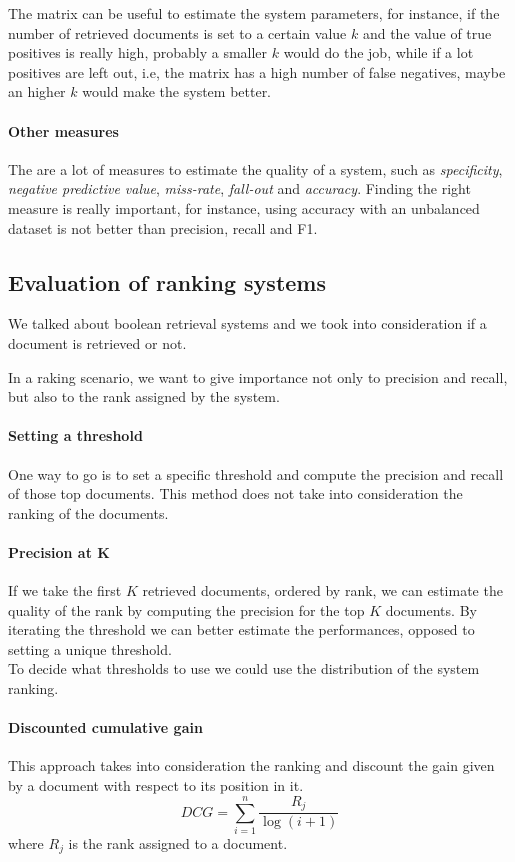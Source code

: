 The matrix can be useful to estimate the system parameters, for instance, 
if the number of retrieved documents is set to a certain value $k$ and 
the value of true positives is really high, probably a smaller $k$ would do the job, 
while if a lot positives are left out, i.e, the matrix has a high number of
false negatives, maybe an higher $k$ would make the system better.

\paragraph{Other measures}
The are a lot of measures to estimate the quality of a system, such as 
\emph{specificity}, \emph{negative predictive value}, \emph{miss-rate}, 
\emph{fall-out} and \emph{accuracy}. 
Finding the right measure is really important, for instance, using accuracy with
an unbalanced dataset is not better than precision, recall and F1.

\subsection{Evaluation of ranking systems}
We talked about boolean retrieval systems and we took into consideration 
if a document is retrieved or not.

In a raking scenario, we want to give importance not only to precision and recall, 
but also to the rank assigned by the system.

\paragraph{Setting a threshold}
One way to go is to set a specific threshold and compute the precision and recall 
of those top documents.
This method does not take into consideration the ranking of the documents.

\paragraph{Precision at K}
If we take the first $K$ retrieved documents, ordered by rank, we can estimate 
the quality of the rank by computing the precision for the top $K$ documents.
By iterating the threshold we can better estimate the performances, opposed to 
setting a unique threshold.\\
To decide what thresholds to use we could use the distribution of the system ranking.

\paragraph{Discounted cumulative gain}
This approach takes into consideration the ranking and discount the gain given by
a document with respect to its position in it.
$$\mathit{DCG} = \sum_{i = 1}^n\frac{R_j}{\log(i+1)}$$
where $R_j$ is the rank assigned to a document.

